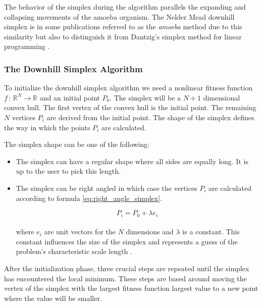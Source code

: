 \documentclass[11pt,a4paper]{report}
\begin{document}
The behavior of the simplex during the algorithm parallels the expanding and
collapsing movements of the amoeba
organism. The Nelder Mead downhill simplex is in
some publications referred to as the \textit{amoeba} method due to this similarity but also to distinguish it from Dantzig's
simplex method for linear programming \cite{Press1992}. 


\subsubsection{The Downhill Simplex Algorithm}

To initialize the downhill simplex algorithm we need a nonlinear fitness function $f\,:\,\mathbb{R}^{N}\rightarrow\mathbb{R}$
and an initial point $P_{0}$. The simplex will be a $N+1$ dimensional convex
hull. The first vertex of the convex hull is the initial point. The remaining
$N$ vertices $P_{i}$ are derived from the initial point. The shape of the simplex defines the way in which the
points $P_{i}$ are calculated\cite{Nelder2009}.

The simplex shape can be one of the following:
\begin{itemize}
\item The simplex can have a regular shape where all sides are equally
long. It is up to the user to pick this length.
\item The simplex can be right angled in which case the vertices
$P_{i}$ are calculated according to formula \ref{eq:right_angle_simplex}.


\begin{equation}\label{eq:right_angle_simplex}
P_{i}=P_{0}+\lambda e_{i}
\end{equation}
\\
where $e_{i}$ are unit vectors for the $N$ dimensions and $\lambda$
is a constant. This constant influences the size of the simplex and
represents a guess of the problem's characteristic scale length \cite{Press1992}.
\end{itemize}

After the initialization phase, three crucial steps are repeated
until the simplex has encountered the local minimum. These steps are
based around moving the vertex of the simplex with the largest fitness
function largest value to a new point where the value will be
smaller. 
\end{document}
